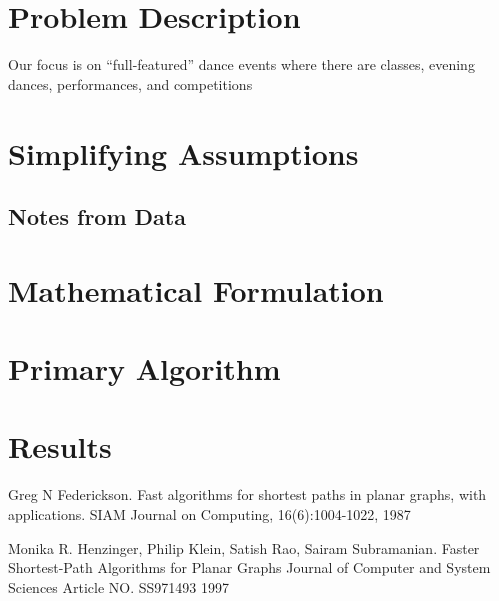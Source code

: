 \documentclass[12pt]{article}
\theoremstyle{definition}
\begin{document}
\section{Problem Description}
Our focus is on ``full-featured'' dance events where there are classes, evening dances, performances, and competitions

\section{Simplifying Assumptions}

\subsection{Notes from Data}

\section{Mathematical Formulation}

\section{Primary Algorithm}

\section{Results}

\begin{thebibliography}{9}
	Greg N Federickson.
	Fast algorithms for shortest paths in planar graphs, with applications.
	SIAM Journal on Computing, 16(6):1004-1022,
	1987

	Monika R. Henzinger, Philip Klein, Satish Rao, Sairam Subramanian.
	Faster Shortest-Path Algorithms for Planar Graphs
	Journal of Computer and System Sciences Article NO. SS971493
	1997

\end{thebibliography}
\end{document}
